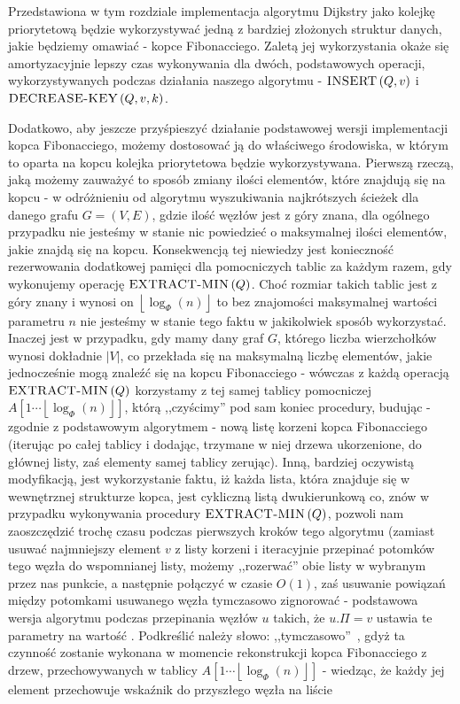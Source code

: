 Przedstawiona w tym rozdziale implementacja algorytmu Dijkstry jako kolejkę priorytetową będzie wykorzystywać jedną z bardziej złożonych struktur danych, jakie będziemy omawiać - kopce Fibonacciego. Zaletą jej wykorzystania okaże się amortyzacyjnie lepszy czas wykonywania dla dwóch, podstawowych operacji, wykorzystywanych podczas działania naszego algorytmu - $\textrm{\textsc{INSERT}} \left( Q, v \right)$ i $\textrm{\textsc{DECREASE-KEY}} \left( Q, v, k \right)$.


Dodatkowo, aby jeszcze przyśpieszyć działanie podstawowej wersji implementacji kopca Fibonacciego, możemy dostosować ją do właściwego środowiska, w którym to oparta na kopcu kolejka priorytetowa będzie wykorzystywana. Pierwszą rzeczą, jaką możemy zauważyć to sposób zmiany ilości elementów, które znajdują się na kopcu - w odróżnieniu od algorytmu wyszukiwania najkrótszych ścieżek dla danego grafu $ G = \left( V, E \right)$, gdzie ilość węzłów jest z góry znana, dla ogólnego przypadku nie jesteśmy w stanie nic powiedzieć o maksymalnej ilości elementów, jakie znajdą się na kopcu. Konsekwencją tej niewiedzy jest konieczność rezerwowania dodatkowej pamięci dla pomocniczych tablic za każdym razem, gdy wykonujemy operację $\textrm{\textsc{EXTRACT-MIN}} \left( Q \right)$. Choć rozmiar takich tablic jest z góry znany i wynosi on $ \left \lfloor \log_{\Phi} \left( n \right) \right \rfloor $ to bez znajomości maksymalnej wartości parametru $n$ nie jesteśmy w stanie tego faktu w jakikolwiek sposób wykorzystać. Inaczej jest w przypadku, gdy mamy dany graf $G$, którego liczba wierzchołków wynosi dokładnie $ \left| V \right|$, co przekłada się na maksymalną liczbę elementów, jakie jednocześnie mogą znaleźć się na kopcu Fibonacciego - wówczas z każdą operacją $\textrm{\textsc{EXTRACT-MIN}} \left( Q \right)$ korzystamy z tej samej tablicy pomocniczej $A \left[ 1 \cdots \left \lfloor \log_{\Phi} \left( n \right) \right \rfloor \right]$, którą ,,czyścimy'' pod sam koniec procedury, budując - zgodnie z podstawowym algorytmem - nową listę korzeni kopca Fibonacciego (iterując po całej tablicy i dodając, trzymane w niej drzewa ukorzenione, do głównej listy, zaś elementy samej tablicy zerując). Inną, bardziej oczywistą modyfikacją, jest wykorzystanie faktu, iż każda lista, która znajduje się w wewnętrznej strukturze kopca, jest cykliczną listą dwukierunkową co, znów w przypadku wykonywania procedury $\textrm{\textsc{EXTRACT-MIN}} \left( Q \right)$, pozwoli nam zaoszczędzić trochę czasu podczas pierwszych kroków tego algorytmu (zamiast usuwać najmniejszy element $v$ z listy korzeni i iteracyjnie przepinać potomków tego węzła do wspomnianej listy, możemy ,,rozerwać'' obie listy w wybranym przez nas punkcie, a następnie połączyć w czasie $O \left( 1 \right)$, zaś usuwanie powiązań między potomkami usuwanego węzła tymczasowo zignorować - podstawowa wersja algorytmu podczas przepinania węzłów $u$ takich, że $ u.\Pi = v$ ustawia te parametry na wartość \KwNull. Podkreślić należy słowo: ,,tymczasowo''~, gdyż ta czynność zostanie wykonana w momencie rekonstrukcji kopca Fibonacciego z drzew, przechowywanych w tablicy $A \left[ 1 \cdots \left \lfloor \log_{\Phi} \left( n \right) \right \rfloor \right]$ - wiedząc, że każdy jej element przechowuje wskaźnik do przyszłego węzła na liście 
